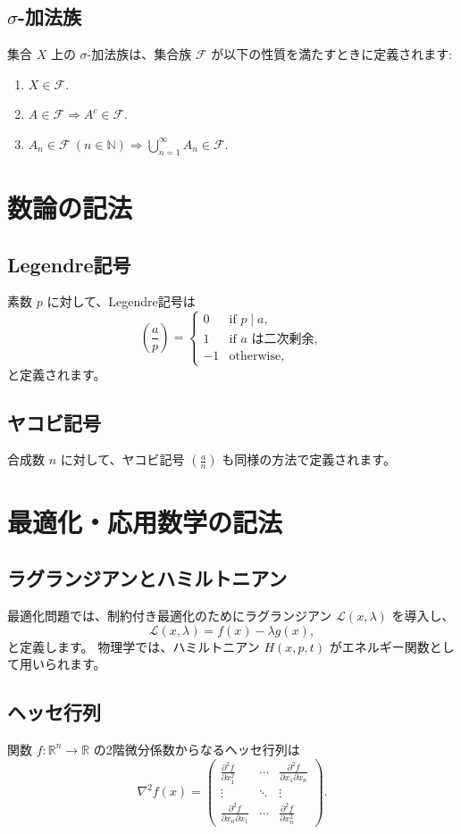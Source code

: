 \documentclass{ltjsarticle} %
\begin{document}
\subsection{\(\sigma\)-加法族}
集合 \( X \) 上の \(\sigma\)-加法族は、集合族 \(\mathcal{F}\) が以下の性質を満たすときに定義されます:
\begin{enumerate}
  \item \( X \in \mathcal{F} \).
  \item \( A \in \mathcal{F} \Rightarrow A^c \in \mathcal{F} \).
  \item \( A_n \in \mathcal{F}\ (n \in \mathbb{N}) \Rightarrow \bigcup_{n=1}^{\infty} A_n \in \mathcal{F} \).
\end{enumerate}

\section{数論の記法}
\subsection{Legendre記号}
素数 \( p \) に対して、Legendre記号は
\[
  \left(\frac{a}{p}\right) = \begin{cases}
    0 & \text{if } p \mid a, \\
    1 & \text{if } a \text{ は二次剰余}, \\
    -1 & \text{otherwise},
  \end{cases}
\]
と定義されます。

\subsection{ヤコビ記号}
合成数 \( n \) に対して、ヤコビ記号 \(\left(\frac{a}{n}\right)\) も同様の方法で定義されます。

\section{最適化・応用数学の記法}
\subsection{ラグランジアンとハミルトニアン}
最適化問題では、制約付き最適化のためにラグランジアン \(\mathcal{L}(x, \lambda)\) を導入し、
\[
  \mathcal{L}(x, \lambda) = f(x) - \lambda g(x),
\]
と定義します。  
物理学では、ハミルトニアン \( H(x,p,t) \) がエネルギー関数として用いられます。

\subsection{ヘッセ行列}
関数 \( f: \mathbb{R}^n \to \mathbb{R} \) の2階微分係数からなるヘッセ行列は
\[
  \nabla^2 f(x) = \begin{pmatrix}
    \frac{\partial^2 f}{\partial x_1^2} & \cdots & \frac{\partial^2 f}{\partial x_1 \partial x_n} \\
    \vdots & \ddots & \vdots \\
    \frac{\partial^2 f}{\partial x_n \partial x_1} & \cdots & \frac{\partial^2 f}{\partial x_n^2}
  \end{pmatrix}.
\]
\end{document}
